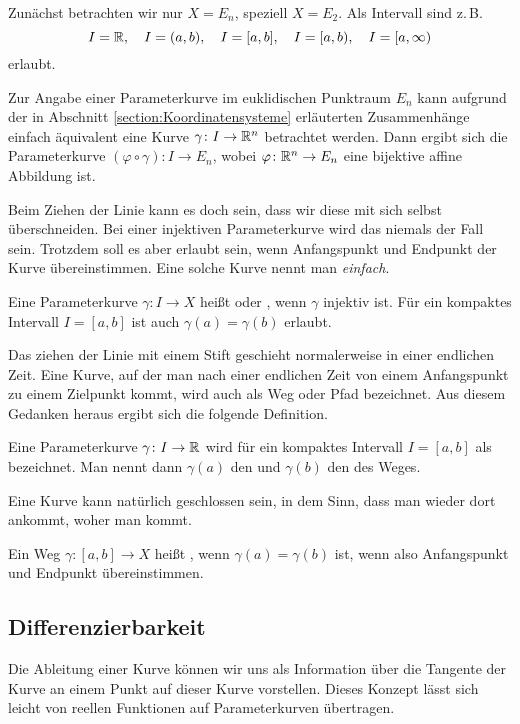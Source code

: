 \noindent
Zunächst betrachten wir nur $X=E_n$, speziell $X=E_2$. Als Intervall
sind z.\,B.%
\[I=\mathbb R,\quad I=(a,b),\quad I=[a,b],\quad
I=[a,b),\quad I=[a,\infty)\]
erlaubt.

Zur Angabe einer Parameterkurve im euklidischen Punktraum $E_n$ kann
aufgrund der in Abschnitt \ref{section:Koordinatensysteme} erläuterten
Zusammenhänge einfach äquivalent eine Kurve $\gamma\colon I \to\mathbb R^n$
betrachtet werden. Dann ergibt sich die Parameterkurve
$(\varphi\circ\gamma)\colon I\to E_n$,
wobei $\varphi\colon \mathbb R^n\to E_n$ eine bijektive affine Abbildung ist.

Beim Ziehen der Linie kann es doch sein, dass wir diese mit sich selbst
überschneiden. Bei einer injektiven Parameterkurve wird das niemals
der Fall sein. Trotzdem soll es aber erlaubt sein, wenn Anfangspunkt
und Endpunkt der Kurve übereinstimmen. Eine solche Kurve nennt man
\emph{einfach}.

\begin{definition}
Eine Parameterkurve $\gamma\colon I\to X$ heißt  oder
, wenn $\gamma$ injektiv ist. Für ein kompaktes
Intervall $I=[a,b]$ ist auch $\gamma(a)=\gamma(b)$ erlaubt.
\end{definition}

\noindent
Das ziehen der Linie mit einem Stift geschieht normalerweise in einer
endlichen Zeit. Eine Kurve, auf der man nach einer endlichen Zeit
von einem Anfangspunkt zu einem Zielpunkt kommt, wird auch als
Weg oder Pfad bezeichnet. Aus diesem Gedanken heraus
ergibt sich die folgende Definition.

\begin{definition}
Eine Parameterkurve $\gamma\colon I\to\mathbb R$ wird für ein kompaktes
Intervall $I=[a,b]$ als  bezeichnet. Man nennt dann
$\gamma(a)$ den  und $\gamma(b)$ den
 des Weges.
\end{definition}

\noindent
Eine Kurve kann natürlich geschlossen sein, in dem Sinn, dass man
wieder dort ankommt, woher man kommt.

\begin{definition}
Ein Weg $\gamma\colon [a,b]\to X$ heißt ,
wenn $\gamma(a)=\gamma(b)$ ist, wenn also Anfangspunkt und
Endpunkt übereinstimmen.
\end{definition}

\subsection{Differenzierbarkeit}
Die Ableitung einer Kurve können wir uns als Information über die
Tangente der Kurve an einem Punkt auf dieser Kurve vorstellen. Dieses
Konzept lässt sich leicht von reellen Funktionen auf Parameterkurven
übertragen.

